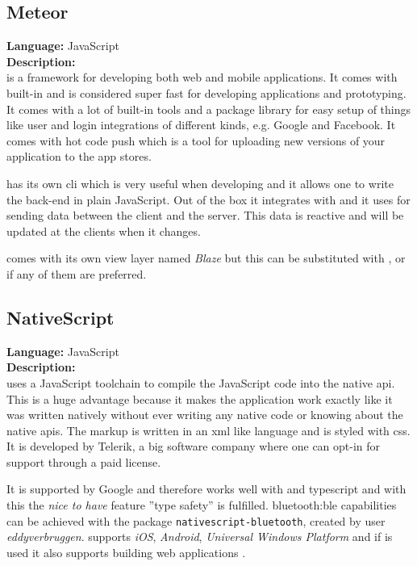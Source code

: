 \subsection*{Meteor}
\textbf{Language:} JavaScript
\\
\textbf{Description:}
\\
 is a framework for developing both web and mobile applications.
It comes with  built-in and is considered super fast for developing applications and prototyping.
It comes with a lot of built-in tools and a package library for easy setup of things like user  and login integrations of different kinds, e.g. Google and Facebook. It comes with hot code push which is a tool for uploading new versions of your application to the app stores.

 has its own \gls{cli} which is very useful when developing and it allows one to write the back-end in plain JavaScript.
Out of the box it integrates with  and it uses  for sending data between the client and the server.
This data is reactive and will be updated at the clients when it changes.

 comes with its own view layer named \textit{Blaze} but this can be substituted with ,  or  if any of them are preferred.

\subsection*{NativeScript}
\textbf{Language:} JavaScript
\\
\textbf{Description:}
\\
 uses a JavaScript toolchain to compile the JavaScript code into the native \gls{api}.
This is a huge advantage because it makes the application work exactly like it was written natively without ever writing any native code or knowing about the native \glspl{api}.
The markup is written in an \gls{xml} like language and is styled with \gls{css}.
It is developed by Telerik, a big software company where one can opt-in for support through a paid license.

It is supported by Google and therefore works well with  and \gls{typescript} and with this the \textit{nice to have} feature ''type safety'' is fulfilled.
\gls{bluetooth:ble} capabilities can be achieved with the  package \verb+nativescript-bluetooth+, created by  user \textit{eddyverbruggen}.
 supports \textit{iOS}, \textit{Android}, \textit{Universal Windows Platform} and if  is used it also supports building web applications \citep{preStudy:frameworks:nativescript}.


